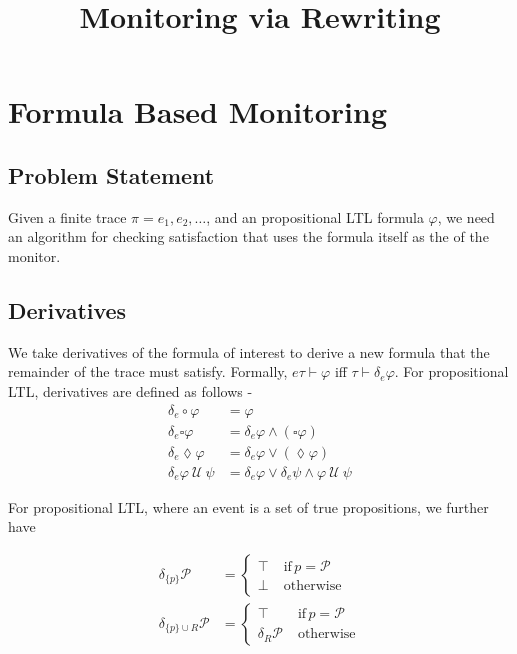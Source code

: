 \documentclass[11pt]{article}
\newcommand{\derivative}[2]{\delta_{#1} #2}
\newcommand{\until}{\ \mathcal{U}\ }
\newcommand{\Prop}{\mathcal{P}}
\begin{document}
\title{Monitoring via Rewriting}

\section{Formula Based Monitoring}

\subsection{Problem Statement}
Given a finite trace $\pi = e_1,e_2,\ldots$, and an propositional LTL formula
$\varphi$, we need an algorithm for checking satisfaction that uses the formula
itself as the  of the monitor.

\subsection{Derivatives}
We take derivatives of the formula of interest to derive a new formula that the
remainder of the trace must satisfy. Formally,  $e\tau \vdash \varphi$ iff $\tau
\vdash \derivative{e}{\varphi}$. For propositional LTL, derivatives are defined
as follows -
\begin{equation}
\begin{split}
  \derivative{e}{\circ \varphi} &= \varphi \\
  \derivative{e}{\square \varphi} &= \derivative{e}{\varphi} \wedge (\square \varphi) \\
  \derivative{e}{\lozenge \varphi} &= \derivative{e}{\varphi} \vee (\lozenge \varphi) \\
  \derivative{e}{\varphi \until \psi} &= \derivative{e}{\varphi} \vee
  \derivative{e}{\psi} \wedge \varphi \until \psi
\end{split}
\end{equation}

For propositional LTL, where an event is a set of true propositions, we further
have

\begin{equation}
  \begin{split}
  \derivative{ \{ p \} }{ \Prop } &=
    \begin{cases}
      \top & \; \text{if}\, p = \Prop \\
      \bot & \; \text{otherwise}
    \end{cases} \\
    \derivative{ \{ p \} \cup \textit{R} }{ \Prop } &=
    \begin{cases}
      \top & \; \text{if}\, p = \Prop \\
      \derivative{ \textit{R} }{\Prop} & \; \text{otherwise}
    \end{cases} \\
  \end{split}
\end{equation}
\end{document}
